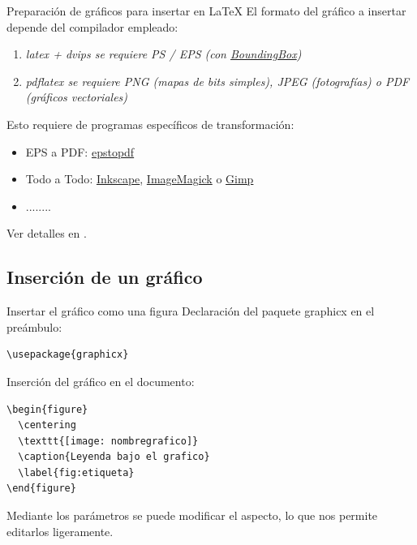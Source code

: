 \documentclass[10pt]{beamer}
\begin{document}
\begin{frame}{Preparaci\'on de gr\'aficos para insertar en \LaTeX}
El formato del gr\'afico a insertar depende del compilador empleado:
\begin{enumerate}
\item \it{latex + dvips}  se requiere PS / EPS {\scriptsize(con \href{http://tex.stackexchange.com/questions/133786/no-boundingbox-error-message}{\color{blue}BoundingBox})}
\item \it {pdflatex} se requiere PNG {\scriptsize(mapas de bits simples)}, JPEG {\scriptsize(fotograf\'ias)} o PDF {\scriptsize(gr\'aficos vectoriales)}
\end{enumerate}

\vspace{0.5cm}
Esto requiere de programas espec\'ificos de transformaci\'on:
\begin{itemize}
\item {\sc EPS a PDF}: \href{http://tug.org/epstopdf/}{\color{blue}epstopdf}
\item {\sc Todo a Todo}: \href{http://www.inkscape.org/es/}{\color{blue}Inkscape}, 
\href{http://www.imagemagick.org}{\color{blue}ImageMagick} o \href{http://www.gimp.org/}{\color{blue}Gimp}
\item ........
\end{itemize}
Ver detalles en \cite{ManualLatexWikilibros}.
\end{frame}

\subsection{Inserci\'on de un gr\'afico}
\begin{frame}[fragile]{Insertar el gr\'afico como una figura}
Declaraci\'on del paquete graphicx en el pre\'ambulo:
\begin{verbatim}\usepackage{graphicx} \end{verbatim}

Inserci\'on del gr\'afico en el documento:
\begin{verbatim}
\begin{figure}
  \centering
  \texttt{[image: nombregrafico]}
  \caption{Leyenda bajo el grafico}
  \label{fig:etiqueta}
\end{figure}
\end{verbatim}
Mediante los par\'ametros se puede modificar el aspecto, lo que 
nos permite editarlos ligeramente.
\end{frame}
\end{document}
